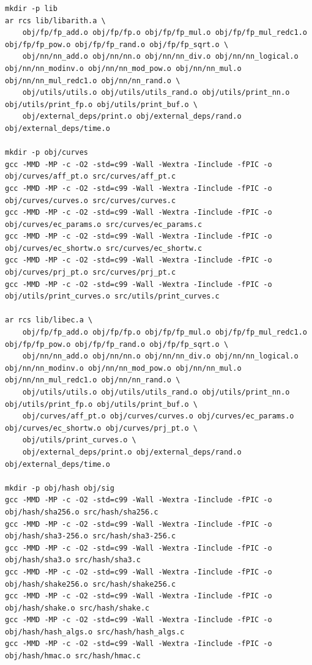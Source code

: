 \begin{lstlisting}[numbers=none]
mkdir -p lib
ar rcs lib/libarith.a \
	obj/fp/fp_add.o obj/fp/fp.o obj/fp/fp_mul.o obj/fp/fp_mul_redc1.o obj/fp/fp_pow.o obj/fp/fp_rand.o obj/fp/fp_sqrt.o \
	obj/nn/nn_add.o obj/nn/nn.o obj/nn/nn_div.o obj/nn/nn_logical.o obj/nn/nn_modinv.o obj/nn/nn_mod_pow.o obj/nn/nn_mul.o obj/nn/nn_mul_redc1.o obj/nn/nn_rand.o \
	obj/utils/utils.o obj/utils/utils_rand.o obj/utils/print_nn.o obj/utils/print_fp.o obj/utils/print_buf.o \
	obj/external_deps/print.o obj/external_deps/rand.o obj/external_deps/time.o 

mkdir -p obj/curves
gcc -MMD -MP -c -O2 -std=c99 -Wall -Wextra -Iinclude -fPIC -o obj/curves/aff_pt.o src/curves/aff_pt.c
gcc -MMD -MP -c -O2 -std=c99 -Wall -Wextra -Iinclude -fPIC -o obj/curves/curves.o src/curves/curves.c
gcc -MMD -MP -c -O2 -std=c99 -Wall -Wextra -Iinclude -fPIC -o obj/curves/ec_params.o src/curves/ec_params.c
gcc -MMD -MP -c -O2 -std=c99 -Wall -Wextra -Iinclude -fPIC -o obj/curves/ec_shortw.o src/curves/ec_shortw.c
gcc -MMD -MP -c -O2 -std=c99 -Wall -Wextra -Iinclude -fPIC -o obj/curves/prj_pt.o src/curves/prj_pt.c
gcc -MMD -MP -c -O2 -std=c99 -Wall -Wextra -Iinclude -fPIC -o obj/utils/print_curves.o src/utils/print_curves.c

ar rcs lib/libec.a \
	obj/fp/fp_add.o obj/fp/fp.o obj/fp/fp_mul.o obj/fp/fp_mul_redc1.o obj/fp/fp_pow.o obj/fp/fp_rand.o obj/fp/fp_sqrt.o \
	obj/nn/nn_add.o obj/nn/nn.o obj/nn/nn_div.o obj/nn/nn_logical.o obj/nn/nn_modinv.o obj/nn/nn_mod_pow.o obj/nn/nn_mul.o obj/nn/nn_mul_redc1.o obj/nn/nn_rand.o \
	obj/utils/utils.o obj/utils/utils_rand.o obj/utils/print_nn.o obj/utils/print_fp.o obj/utils/print_buf.o \
	obj/curves/aff_pt.o obj/curves/curves.o obj/curves/ec_params.o obj/curves/ec_shortw.o obj/curves/prj_pt.o \
	obj/utils/print_curves.o \
	obj/external_deps/print.o obj/external_deps/rand.o obj/external_deps/time.o 

mkdir -p obj/hash obj/sig
gcc -MMD -MP -c -O2 -std=c99 -Wall -Wextra -Iinclude -fPIC -o obj/hash/sha256.o src/hash/sha256.c
gcc -MMD -MP -c -O2 -std=c99 -Wall -Wextra -Iinclude -fPIC -o obj/hash/sha3-256.o src/hash/sha3-256.c
gcc -MMD -MP -c -O2 -std=c99 -Wall -Wextra -Iinclude -fPIC -o obj/hash/sha3.o src/hash/sha3.c
gcc -MMD -MP -c -O2 -std=c99 -Wall -Wextra -Iinclude -fPIC -o obj/hash/shake256.o src/hash/shake256.c
gcc -MMD -MP -c -O2 -std=c99 -Wall -Wextra -Iinclude -fPIC -o obj/hash/shake.o src/hash/shake.c
gcc -MMD -MP -c -O2 -std=c99 -Wall -Wextra -Iinclude -fPIC -o obj/hash/hash_algs.o src/hash/hash_algs.c
gcc -MMD -MP -c -O2 -std=c99 -Wall -Wextra -Iinclude -fPIC -o obj/hash/hmac.o src/hash/hmac.c


\end{lstlisting}

